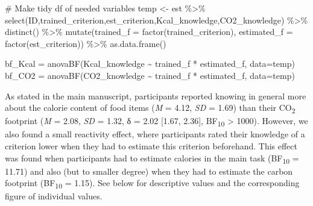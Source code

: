 \documentclass[
  letterpaper,
  DIV=11,
  numbers=noendperiod]{scrartcl}
\newenvironment{Shaded}{\begin{snugshade}}{\end{snugshade}}
\newcommand{\AttributeTok}[1]{\textcolor[rgb]{0.40,0.45,0.13}{#1}}
\newcommand{\CommentTok}[1]{\textcolor[rgb]{0.37,0.37,0.37}{#1}}
\newcommand{\FunctionTok}[1]{\textcolor[rgb]{0.28,0.35,0.67}{#1}}
\newcommand{\NormalTok}[1]{\textcolor[rgb]{0.00,0.23,0.31}{#1}}
\newcommand{\OtherTok}[1]{\textcolor[rgb]{0.00,0.23,0.31}{#1}}
\newcommand{\SpecialCharTok}[1]{\textcolor[rgb]{0.37,0.37,0.37}{#1}}
\begin{document}
\begin{Shaded}
\begin{Highlighting}[]
\CommentTok{\# Make tidy df of needed variables}
\NormalTok{temp }\OtherTok{\textless{}{-}}\NormalTok{ est }\SpecialCharTok{\%\textgreater{}\%} 
          \FunctionTok{select}\NormalTok{(ID,trained\_criterion,est\_criterion,Kcal\_knowledge,CO2\_knowledge) }\SpecialCharTok{\%\textgreater{}\%} 
          \FunctionTok{distinct}\NormalTok{() }\SpecialCharTok{\%\textgreater{}\%} 
          \FunctionTok{mutate}\NormalTok{(}\AttributeTok{trained\_f   =} \FunctionTok{factor}\NormalTok{(trained\_criterion),}
                 \AttributeTok{estimated\_f =} \FunctionTok{factor}\NormalTok{(est\_criterion)) }\SpecialCharTok{\%\textgreater{}\%} 
          \FunctionTok{as.data.frame}\NormalTok{()  }

\NormalTok{bf\_Kcal }\OtherTok{=} \FunctionTok{anovaBF}\NormalTok{(Kcal\_knowledge }\SpecialCharTok{\textasciitilde{}}\NormalTok{ trained\_f }\SpecialCharTok{*}\NormalTok{ estimated\_f, }\AttributeTok{data=}\NormalTok{temp)}
\NormalTok{bf\_CO2  }\OtherTok{=} \FunctionTok{anovaBF}\NormalTok{(CO2\_knowledge }\SpecialCharTok{\textasciitilde{}}\NormalTok{ trained\_f }\SpecialCharTok{*}\NormalTok{ estimated\_f, }\AttributeTok{data=}\NormalTok{temp)}
\end{Highlighting}
\end{Shaded}

As stated in the main manuscript, participants reported knowing in
general more about the calorie content of food items (\emph{M} = 4.12,
\emph{SD} = 1.69) than their CO\textsubscript{2} footprint (\emph{M} =
2.08, \emph{SD} = 1.32, δ = 2.02 {[}1.67, 2.36{]}, BF\textsubscript{10}
\textgreater{} 1000). However, we also found a small reactivity effect,
where participants rated their knowledge of a criterion lower when they
had to estimate this criterion beforehand. This effect was found when
participants had to estimate calories in the main task
(BF\textsubscript{10} = 11.71) and also (but to smaller degree) when
they had to estimate the carbon footprint (BF\textsubscript{10} = 1.15).
See below for descriptive values and the corresponding figure of
individual values.
\end{document}
